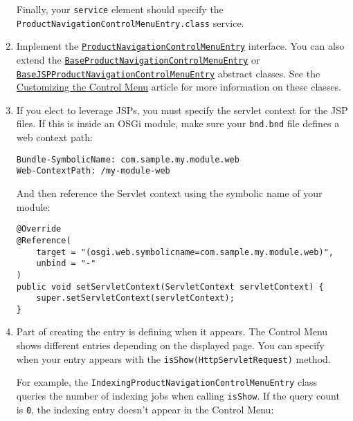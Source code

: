 \begin{enumerate}
  Finally, your \texttt{service} element should specify the
  \texttt{ProductNavigationControlMenuEntry.class} service.
\item
  Implement the
  \href{https://docs.liferay.com/dxp/apps/product-navigation/latest/javadocs/com/liferay/product/navigation/control/menu/ProductNavigationControlMenuEntry.html}{\texttt{ProductNavigationControlMenuEntry}}
  interface. You can also extend the
  \href{https://docs.liferay.com/dxp/apps/product-navigation/latest/javadocs/com/liferay/product/navigation/control/menu/BaseProductNavigationControlMenuEntry.html}{\texttt{BaseProductNavigationControlMenuEntry}}
  or
  \href{https://docs.liferay.com/dxp/apps/product-navigation/latest/javadocs/com/liferay/product/navigation/control/menu/BaseJSPProductNavigationControlMenuEntry.html}{\texttt{BaseJSPProductNavigationControlMenuEntry}}
  abstract classes. See the
  \href{/docs/7-2/customization/-/knowledge_base/c/customizing-the-control-menu}{Customizing
  the Control Menu} article for more information on these classes.
\item
  If you elect to leverage JSPs, you must specify the servlet context
  for the JSP files. If this is inside an OSGi module, make sure your
  \texttt{bnd.bnd} file defines a web context path:

\begin{verbatim}
Bundle-SymbolicName: com.sample.my.module.web
Web-ContextPath: /my-module-web
\end{verbatim}

  And then reference the Servlet context using the symbolic name of your
  module:

\begin{verbatim}
@Override
@Reference(
    target = "(osgi.web.symbolicname=com.sample.my.module.web)",
    unbind = "-"
)
public void setServletContext(ServletContext servletContext) {
    super.setServletContext(servletContext);
}
\end{verbatim}
\item
  Part of creating the entry is defining when it appears. The Control
  Menu shows different entries depending on the displayed page. You can
  specify when your entry appears with the
  \texttt{isShow(HttpServletRequest)} method.

  For example, the \texttt{IndexingProductNavigationControlMenuEntry}
  class queries the number of indexing jobs when calling
  \texttt{isShow}. If the query count is \texttt{0}, the indexing entry
  doesn't appear in the Control Menu:


\end{enumerate}
